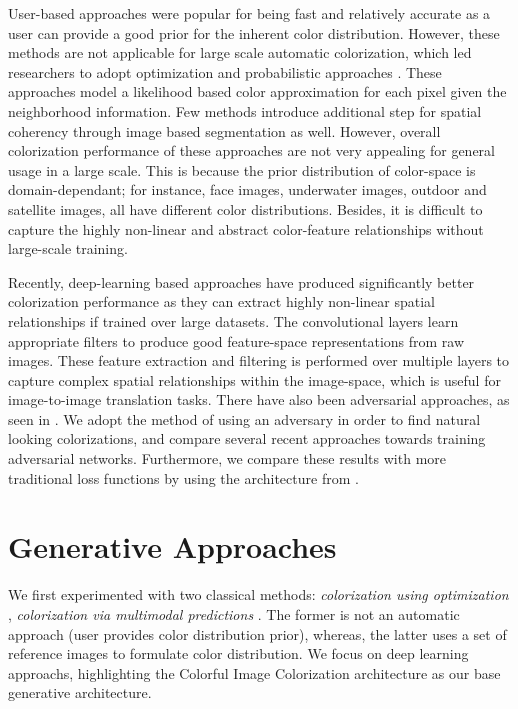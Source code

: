 \documentclass[10pt]{article}
\begin{document}
User-based approaches \cite{levin2004colorization, konushin2006interactive, reinhard2001color, vrhel1992color} were popular for being fast and relatively accurate as a user can provide a good
prior for the inherent color distribution. However, these methods are not applicable for large scale automatic colorization, which led researchers to adopt optimization and probabilistic
approaches \cite{charpiat2008automatic, bugeau2014variational, lagodzinski2008digital}. These approaches model a likelihood based color approximation for each pixel given the neighborhood information. 
Few methods introduce additional step for spatial coherency through image based segmentation as well. However, overall colorization performance of these approaches are not very appealing
\cite{deshpande2015learning} for general usage in a large scale. This is because the prior distribution of color-space is domain-dependant; for instance, face images, underwater images,
outdoor and satellite images, all have different color distributions. Besides, it is difficult to capture the highly non-linear and abstract color-feature relationships without large-scale training. 

Recently, deep-learning based approaches \cite{zhang2016colorful, cheng2015deep, varga2016fully, li2017watergan} have produced significantly better colorization performance as they can extract
highly non-linear spatial relationships if trained over large datasets. The convolutional layers learn appropriate filters to produce good feature-space representations from raw images.
These feature extraction and filtering is performed over multiple layers to capture complex spatial relationships within the image-space, which is useful for image-to-image translation tasks.
There have also been adversarial approaches, as seen in \cite{isola2016image}. We adopt the method of using an adversary in order to find natural looking colorizations, and compare several
recent approaches towards training adversarial networks. Furthermore, we compare these results with more traditional loss functions by using the architecture from \cite{zhang2016colorful}.

\section{Generative Approaches}
We first experimented with two classical methods: \textit{colorization using optimization} \cite{levin2004colorization}, \textit{colorization via multimodal predictions} \cite{charpiat2008automatic}.
The former is not an automatic approach (user provides color distribution prior), whereas, the latter uses a set of reference images to formulate color distribution.
We focus on deep learning approachs, highlighting the Colorful Image Colorization \cite{zhang2016colorful} architecture as our base generative architecture.
\end{document}
